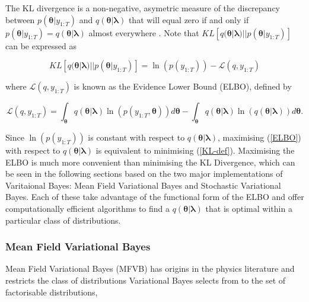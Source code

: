 \documentclass[12pt,a4paper]{article}%
\numberwithin{equation}{section}
\begin{document}
The KL divergence is a non-negative, asymetric measure of the discrepancy between $p(\boldsymbol{\theta} | y_{1:T})$ and $q(\boldsymbol{\theta} | \boldsymbol{\lambda})$ that will equal zero if and only if $p(\boldsymbol{\theta} | y_{1:T}) = q(\boldsymbol{\theta} | \boldsymbol{\lambda})$ almost everywhere \citep{Bishop2006}. Note that $KL[q(\boldsymbol{\theta} | \boldsymbol{\lambda})||p(\boldsymbol{\theta} | y_{1:T})]$ can be expressed as

\begin{equation}
\label{KL-ELBO}
KL[q(\boldsymbol{\theta} | \boldsymbol{\lambda})||p(\boldsymbol{\theta} | y_{1:T})] = \ln(p(y_{1:T})) - \mathcal{L}(q, y_{1:T})
\end{equation}

where $\mathcal{L}(q, y_{1:T})$ is known as the Evidence Lower Bound (ELBO), defined by

\begin{equation}
\label{ELBO}
\mathcal{L}(q, y_{1:T}) = \int_{\boldsymbol{\theta}} q(\boldsymbol{\theta} | \boldsymbol{\lambda}) \ln (p(y_{1:T},\boldsymbol{\theta})) d\boldsymbol{\theta} -  \int_{\boldsymbol{\theta}} q(\boldsymbol{\theta} | \boldsymbol{\lambda}) \ln (q(\boldsymbol{\theta} | \boldsymbol{\lambda})) d\boldsymbol{\theta}.
\end{equation}

Since $\ln(p(y_{1:T}))$ is constant with respect to $q(\boldsymbol{\theta} | \boldsymbol{\lambda})$, maximising (\ref{ELBO}) with respect to $q(\boldsymbol{\theta} | \boldsymbol{\lambda})$ is equivalent to minimising (\ref{KL-def}). Maximising the ELBO is much more convenient than minimising the KL Divergence, which can be seen in the following sections based on the two major implementations of Varitaional Bayes: Mean Field Variational Bayes and Stochastic Variational Bayes. Each of these take advantage of the functional form of the ELBO and offer computationally efficient algorithms to find a $q(\boldsymbol{\theta} | \boldsymbol{\lambda})$ that is optimal within a particular class of distributions. 

\subsubsection{Mean Field Variational Bayes} 

Mean Field Variational Bayes (MFVB) has origins in the physics literature \citep{Chandler1987} and restricts the class of distributions Variational Bayes selects from to the set of factorisable distributions,
\end{document}
